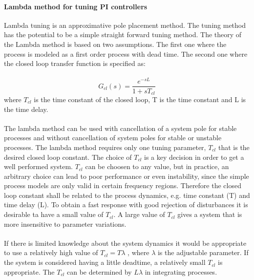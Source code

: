 \paragraph{Lambda method for tuning PI controllers}
Lambda tuning is an approximative pole placement method. The tuning method has the potential to be a simple straight forward tuning method. The theory of the Lambda method is based on two assumptions. The first one where the process is modeled as a first order process with dead time. The second one where the closed loop transfer function is specified as:\\
\\
\begin{equation}
\label{eq:lambda}
G_{cl}(s) = \frac{e^{-sL}}{1+ sT_{cl}}
\end{equation}
where $ T_{cl} $ is the time constant of the closed loop, T is the time constant and L is the time delay.\\
\\
The lambda method can be used with cancellation of a system pole for stable processes and without cancellation of system poles for stable or unstable processes. The lambda method requires only one tuning parameter, $ T_{cl} $ that is the desired closed loop constant. The choice of $ T_{cl} $ is a key decision in order to get a well performed system. $ T_{cl} $ can be choosen to any value, but in practice, an arbitrary choice can lead to poor performance or even instability, since the simple process models are only valid in certain frequency regions. Therefore the closed loop constant shall be related to the process dynamics, e.g. time constant (T) and time delay (L). To obtain a fast response with good rejection of disturbances it is desirable ta have a small value of $ T_{cl} $. A large value of $ T_{cl} $  gives a system that is more insensitive to parameter variations. \\
\\
If there is limited knowledge about the system dynamics it would be appropriate to use a relatively high value of $ T_{cl}  =T\lambda $ , where $\lambda$ is the adjustable parameter. If the system is considered having a little deadtime, a relatively small $ T_{cl} $ is appropriate. The $ T_{cl} $ can be determined by $ L\lambda $ in integrating processes. 
\cite{6}










